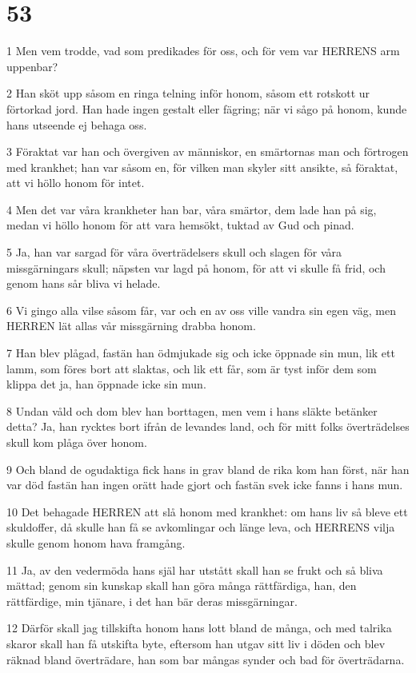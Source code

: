 \chapter{53}

\par 1 Men vem trodde, vad som predikades för oss, och för vem var HERRENS arm uppenbar?
\par 2 Han sköt upp såsom en ringa telning inför honom, såsom ett rotskott ur förtorkad jord. Han hade ingen gestalt eller fägring; när vi sågo på honom, kunde hans utseende ej behaga oss.
\par 3 Föraktat var han och övergiven av människor, en smärtornas man och förtrogen med krankhet; han var såsom en, för vilken man skyler sitt ansikte, så föraktat, att vi höllo honom för intet.
\par 4 Men det var våra krankheter han bar, våra smärtor, dem lade han på sig, medan vi höllo honom för att vara hemsökt, tuktad av Gud och pinad.
\par 5 Ja, han var sargad för våra överträdelsers skull och slagen för våra missgärningars skull; näpsten var lagd på honom, för att vi skulle få frid, och genom hans sår bliva vi helade.
\par 6 Vi gingo alla vilse såsom får, var och en av oss ville vandra sin egen väg, men HERREN lät allas vår missgärning drabba honom.
\par 7 Han blev plågad, fastän han ödmjukade sig och icke öppnade sin mun, lik ett lamm, som föres bort att slaktas, och lik ett får, som är tyst inför dem som klippa det ja, han öppnade icke sin mun.
\par 8 Undan våld och dom blev han borttagen, men vem i hans släkte betänker detta? Ja, han rycktes bort ifrån de levandes land, och för mitt folks överträdelses skull kom plåga över honom.
\par 9 Och bland de ogudaktiga fick hans in grav bland de rika kom han först, när han var död fastän han ingen orätt hade gjort och fastän svek icke fanns i hans mun.
\par 10 Det behagade HERREN att slå honom med krankhet: om hans liv så bleve ett skuldoffer, då skulle han få se avkomlingar och länge leva, och HERRENS vilja skulle genom honom hava framgång.
\par 11 Ja, av den vedermöda hans själ har utstått skall han se frukt och så bliva mättad; genom sin kunskap skall han göra många rättfärdiga, han, den rättfärdige, min tjänare, i det han bär deras missgärningar.
\par 12 Därför skall jag tillskifta honom hans lott bland de många, och med talrika skaror skall han få utskifta byte, eftersom han utgav sitt liv i döden och blev räknad bland överträdare, han som bar mångas synder och bad för överträdarna.

